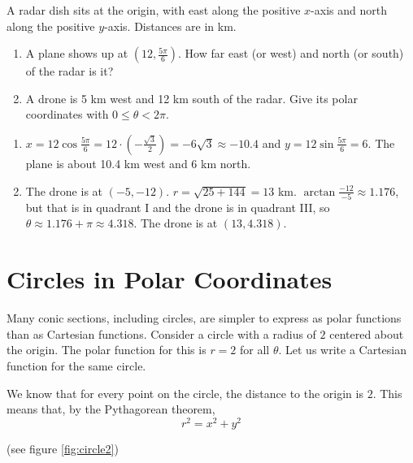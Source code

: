 \begin{Exercise}[title={Air Traffic Control}, label=polar_radar]
A radar dish sits at the origin, with east along the positive $x$-axis and
north along the positive $y$-axis. Distances are in km.
\begin{enumerate}
\item A plane shows up at $(12, \frac{5\pi}{6})$. How far east (or west)
and north (or south) of the radar is it?
\item A drone is 5 km west and 12 km south of the radar. Give its polar
coordinates with $0 \leq \theta < 2\pi$.
\end{enumerate}
\end{Exercise}

\begin{Answer}[ref=polar_radar]
\begin{enumerate}
\item $x = 12\cos{\frac{5\pi}{6}} = 12 \cdot \left(-\frac{\sqrt{3}}{2}\right)
= -6\sqrt{3} \approx -10.4$ and $y = 12 \sin{\frac{5\pi}{6}} = 6$. The plane
is about 10.4 km west and 6 km north.
\item The drone is at $(-5, -12)$. $r = \sqrt{25 + 144} = 13$ km.
$\arctan{\frac{-12}{-5}} \approx 1.176$, but that is in quadrant I and the
drone is in quadrant III, so $\theta \approx 1.176 + \pi \approx 4.318$. The
drone is at $(13, 4.318)$.
\end{enumerate}
\end{Answer}

\section{Circles in Polar Coordinates}
Many conic sections, including circles, are simpler to express as polar 
functions than as Cartesian functions. Consider a circle with a radius of $2$ 
centered about the origin. The polar function for this is $r = 2$ for all 
$\theta$. Let us write a Cartesian function for the same circle. 

We know that for every point on the circle, the distance to the origin is $2$. 
This means that, by the Pythagorean theorem, 
$$r^2 = x^2 + y^2$$

(see figure \ref{fig:circle2})

